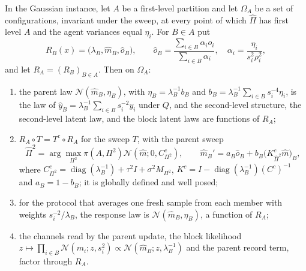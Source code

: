 In the Gaussian instance, let $A$ be a first-level partition and let
$\Omega_A$ be a set of configurations, invariant under the sweep, at every
point of which $\hat\Pi$ has first level $A$ and the agent variances equal
$\eta_i$. For $B\in A$ put
\begin{equation}
 R_B(x)=\big(\lambda_B,\hat m_B,\hat o_B\big),\qquad
 \hat o_B=\frac{\sum_{i\in B}\alpha_io_i}{\sum_{i\in B}\alpha_i},
 \quad\alpha_i=\frac{\eta_i}{s_i^2\rho_i^2},
 \label{gf:retention}
\end{equation}
and let $R_A=(R_B)_{B\in A}$. Then on $\Omega_A$:
\begin{enumerate}
\item[(L)] the parent law $\mathcal N(\hat m_B,\eta_B)$, with
$\eta_B=\lambda_B^{-1}b_B$ and $b_B=\lambda_B^{-1}\sum_{i\in B}s_i^{-4}\eta_i$,
is the law of $\hat y_B=\lambda_B^{-1}\sum_{i\in B}s_i^{-2}y_i$ under $Q$, and
the second-level structure, the second-level latent law, and the block
latent laws are functions of $R_A$;
\item[(D)] $R_A\circ T=T^c\circ R_A$ for the sweep $T$, with the parent sweep
\begin{equation}
 \hat\Pi^2=\arg\max_{\Pi^2}\pi(A,\Pi^2)\mathcal N(\hat m;0,C^c_{\Pi^2}),\qquad
 \hat m_B'=a_B\hat o_B+b_B\big(K^c_{\hat\Pi^2}\hat m\big)_B,
 \label{gf:parent-sweep}
\end{equation}
where $C^c_{\Pi^2}=\operatorname{diag}(\lambda_B^{-1})+\tau^2I+\sigma^2M_{\Pi^2}$,
$K^c=I-\operatorname{diag}(\lambda_B^{-1})(C^c)^{-1}$ and $a_B=1-b_B$; it is
globally defined and well posed;
\item[(B)] for the protocol that averages one fresh sample from each member
with weights $s_i^{-2}/\lambda_B$, the response law is $\mathcal N(\hat
m_B,\eta_B)$, a function of $R_A$;
\item[(C)] the channels read by the parent update, the block likelihood
$z\mapsto\prod_{i\in B}\mathcal N(m_i;z,s_i^2)\propto\mathcal N(\hat
m_B;z,\lambda_B^{-1})$ and the parent record term, factor through $R_A$.
\end{enumerate}
